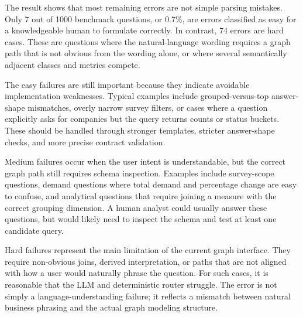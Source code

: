\documentclass[
  12pt,
  english,
  oneside]{report}
\begin{document}
The result shows that most remaining errors are not simple parsing mistakes. Only 7 out of 1000 benchmark questions, or 0.7\%, are errors classified as easy for a knowledgeable human to formulate correctly. In contrast, 74 errors are hard cases. These are questions where the natural-language wording requires a graph path that is not obvious from the wording alone, or where several semantically adjacent classes and metrics compete.

The easy failures are still important because they indicate avoidable implementation weaknesses. Typical examples include grouped-versus-top answer-shape mismatches, overly narrow survey filters, or cases where a question explicitly asks for companies but the query returns counts or status buckets. These should be handled through stronger templates, stricter answer-shape checks, and more precise contract validation.

Medium failures occur when the user intent is understandable, but the correct graph path still requires schema inspection. Examples include survey-scope questions, demand questions where total demand and percentage change are easy to confuse, and analytical questions that require joining a measure with the correct grouping dimension. A human analyst could usually answer these questions, but would likely need to inspect the schema and test at least one candidate query.

Hard failures represent the main limitation of the current graph interface. They require non-obvious joins, derived interpretation, or paths that are not aligned with how a user would naturally phrase the question. For such cases, it is reasonable that the LLM and deterministic router struggle. The error is not simply a language-understanding failure; it reflects a mismatch between natural business phrasing and the actual graph modeling structure.
\end{document}
